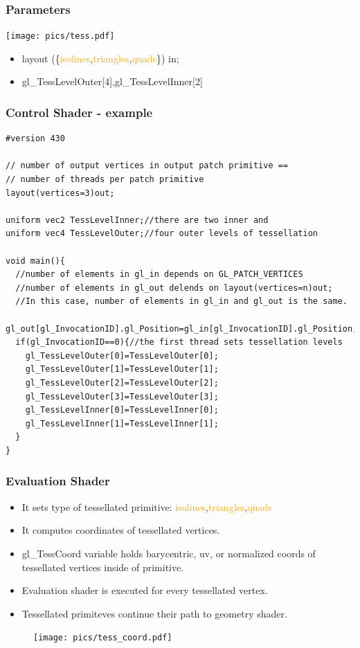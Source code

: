 \begin{frame}
    \frametitle{Parameters}

    \texttt{[image: pics/tess.pdf]}

    \begin{itemize}
				\item \textcolor{OliveGreen}{layout}
					(\{\textcolor{orange}{isolines},\textcolor{orange}{triangles},\textcolor{orange}{quads}\})
					\textcolor{OliveGreen}{in};
				\item \textcolor{OliveGreen}{gl\_TessLevelOuter}[4],\textcolor{OliveGreen}{gl\_TessLevelInner}[2]
    \end{itemize}
\end{frame}

\begin{frame}[fragile]
\frametitle{Control Shader - example}
{\scriptsize
\begin{verbatim}
#version 430

// number of output vertices in output patch primitive ==
// number of threads per patch primitive
layout(vertices=3)out;

uniform vec2 TessLevelInner;//there are two inner and
uniform vec4 TessLevelOuter;//four outer levels of tessellation

void main(){
  //number of elements in gl_in depends on GL_PATCH_VERTICES
  //number of elements in gl_out delends on layout(vertices=n)out;
  //In this case, number of elements in gl_in and gl_out is the same.
  gl_out[gl_InvocationID].gl_Position=gl_in[gl_InvocationID].gl_Position;//copy
  if(gl_InvocationID==0){//the first thread sets tessellation levels
    gl_TessLevelOuter[0]=TessLevelOuter[0];
    gl_TessLevelOuter[1]=TessLevelOuter[1];
    gl_TessLevelOuter[2]=TessLevelOuter[2];
    gl_TessLevelOuter[3]=TessLevelOuter[3];
    gl_TessLevelInner[0]=TessLevelInner[0];
    gl_TessLevelInner[1]=TessLevelInner[1];
  }
}
\end{verbatim}
}
\end{frame}

\begin{frame}
\frametitle{Evaluation Shader}
	\begin{itemize}
		\item It sets type of tessellated primitive: \textcolor{Orange}{isolines},\textcolor{orange}{triangles},\textcolor{orange}{quads}
		\item It computes coordinates of tessellated vertices.
		\item \textcolor{OliveGreen}{gl\_TessCoord} variable holds barycentric, uv, or normalized coords of tessellated vertices inside of primitive.
		\item Evaluation shader is executed for every tessellated vertex.
		\item Tessellated primiteves continue their path to geometry shader.
	\end{itemize}
	\begin{figure}[h]
	\texttt{[image: pics/tess\_coord.pdf]}
	\end{figure}
\end{frame}


